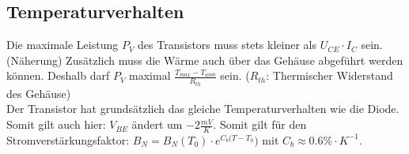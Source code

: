 	\subsection{Temperaturverhalten}
		Die maximale Leistung $P_V$ des Transistors muss stets kleiner als 
		$U_{CE} \cdot I_C$ sein. (Näherung)
		Zusätzlich muss die Wärme auch über das Gehäuse abgeführt werden können. Deshalb
		darf $P_V$ maximal $\frac{T_{max}-T_{amb}}{R_{th}}$ sein. ($R_{th}$: Thermischer
		Widerstand des Gehäuse) \\
		Der Transistor hat grundsätzlich das gleiche Temperaturverhalten wie die Diode. Somit
		gilt auch hier: $V_{BE}$ ändert um $-2\frac{mV}{K}$. Somit gilt für den
		Stromverstärkungsfaktor: $B_N=B_N(T_0)\cdot e^{C_b(T-T_0})$ mit 
		$C_b \approx 0.6\% \cdot K^{-1}$. \\
				
